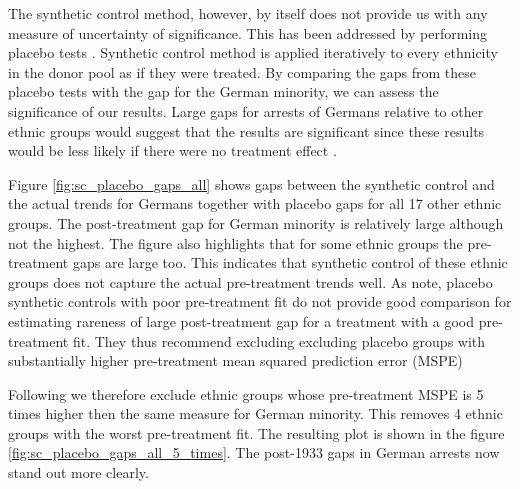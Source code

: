 The synthetic control method, however, by itself does not provide us with any measure of uncertainty of significance. This has been addressed by performing placebo tests \citep{abadie_synthetic_2010}. Synthetic control method is applied iteratively to every ethnicity in the donor pool
as if they were treated. By comparing the gaps from these placebo tests with the gap for the German minority, we can assess the
significance of our results.
Large gaps for arrests of Germans relative to other ethnic groups would suggest that the results are significant since these results would be less likely if there were no treatment effect . 

Figure \ref{fig:sc_placebo_gaps_all} shows gaps between the synthetic control and the actual trends for Germans together with placebo gaps for all 17 other ethnic groups. The post-treatment gap for German minority is relatively large although not the highest. The figure also highlights that for some ethnic groups the pre-treatment gaps are large too. This indicates that synthetic control of these ethnic groups does not capture the actual pre-treatment trends well. As \citet{abadie_synthetic_2010} note, placebo synthetic controls  with poor pre-treatment fit do not provide good comparison
for estimating rareness of large  post-treatment gap for a treatment with a good pre-treatment fit. They thus recommend excluding excluding placebo groups with substantially higher pre-treatment mean squared prediction error  (MSPE)

Following \citet{abadie_synthetic_2010}  we therefore exclude ethnic groups whose pre-treatment MSPE is 5 times higher then the same measure for German minority. This removes 4 ethnic groups with the worst pre-treatment fit. The resulting plot is shown in the figure \ref{fig:sc_placebo_gaps_all_5_times}. The post-1933 gaps in German arrests now stand out more clearly. 

